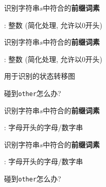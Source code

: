 \begin{frame}{}
  \begin{center}
    识别字符串$s$中符合的{\bf 前缀词素}

    \vspace{0.60cm}
    \intnum: 整数 (简化处理, 允许以0开头)

    \pause
    \vspace{0.60cm}
  \end{center}
\end{frame}

\begin{frame}{}
  \begin{center}
    识别字符串$s$中符合的{\bf 前缀词素}

    \vspace{0.60cm}
    \intnum: 整数 (简化处理, 允许以0开头)

    \vspace{0.60cm}

    用于识别\blue{\intnum}的状态转移图

    \pause
    \vspace{0.40cm}
     碰到\texttt{other}怎么办?
  \end{center}
\end{frame}

\begin{frame}{}
  \begin{center}
    识别字符串$s$中符合的{\bf 前缀词素}

    \vspace{0.50cm}
    \id: 字母开头的字母/数字串

    \pause
    \vspace{0.20cm}

  \end{center}
\end{frame}

\begin{frame}{}
  \begin{center}
    识别字符串$s$中符合的{\bf 前缀词素}

    \vspace{0.60cm}
    \id: 字母开头的字母/数字串

    \vspace{0.60cm}

    \pause
    \vspace{0.40cm}
     碰到\texttt{other}怎么办?
  \end{center}
\end{frame}

